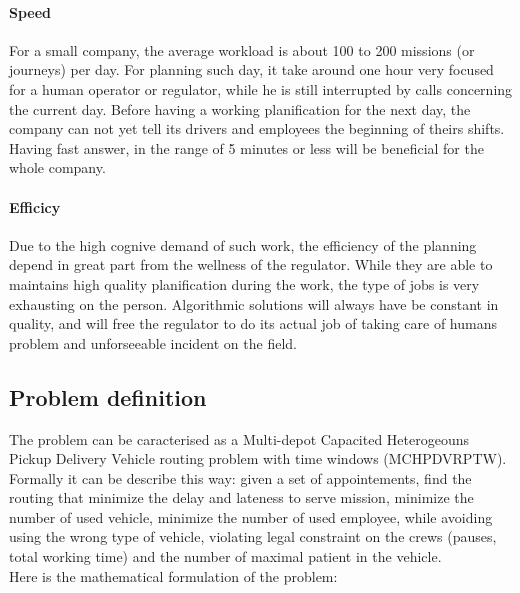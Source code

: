 \documentclass[12pt]{memoir}
\begin{document}
\paragraph{Speed} %
\label{par:Speed}
For a small company, the average workload is about 100 to 200 missions (or journeys)
per day. For planning such day, it take around one hour very focused for a human
operator or regulator, while he is still interrupted by calls concerning the current
day. Before having a working planification for the next day, the company can not yet
tell its drivers and employees the beginning of theirs shifts. Having fast answer,
in the range of 5 minutes or less will be beneficial for the whole company.
\paragraph{Efficicy} %
\label{par:Efficicy}
Due to the high cognive demand of such work, the efficiency of the planning depend
in great part from the wellness of the regulator. While they are able to maintains
high quality planification during the work, the type of jobs is very exhausting on
the person. Algorithmic solutions will always have be constant in quality, and will
free the regulator to do its actual job of taking care of humans problem and
unforseeable incident on the field.


\subsection{Problem definition}
The problem can be caracterised as a Multi-depot Capacited Heterogeouns Pickup
Delivery Vehicle routing problem with time windows (MCHPDVRPTW). \\
Formally it can be describe this way: given a set of appointements, find the routing that minimize the
delay and lateness to serve mission, minimize the number of used vehicle, minimize
the number of used employee, while avoiding using the wrong type of vehicle,
violating legal constraint on the crews (pauses, total working time) and the number
of maximal patient in the vehicle.\\
Here is the mathematical formulation of the problem:
%
%
\end{document}
